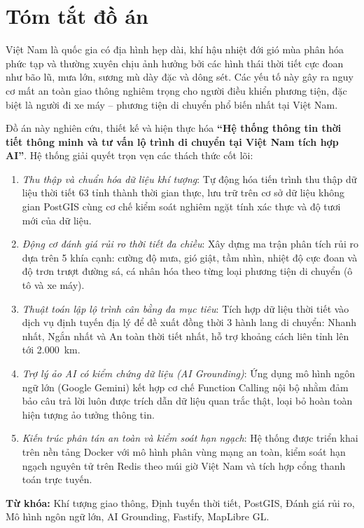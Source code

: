 \chapter*{Tóm tắt đồ án}

Việt Nam là quốc gia có địa hình hẹp dài, khí hậu nhiệt đới gió mùa phân hóa phức tạp và thường xuyên chịu ảnh hưởng bởi các hình thái thời tiết cực đoan như bão lũ, mưa lớn, sương mù dày đặc và dông sét. Các yếu tố này gây ra nguy cơ mất an toàn giao thông nghiêm trọng cho người điều khiển phương tiện, đặc biệt là người đi xe máy -- phương tiện di chuyển phổ biến nhất tại Việt Nam.

Đồ án này nghiên cứu, thiết kế và hiện thực hóa \textbf{“Hệ thống thông tin thời tiết thông minh và tư vấn lộ trình di chuyển tại Việt Nam tích hợp AI”}. Hệ thống giải quyết trọn vẹn các thách thức cốt lõi:
\begin{enumerate}
    \item \textit{Thu thập và chuẩn hóa dữ liệu khí tượng}: Tự động hóa tiến trình thu thập dữ liệu thời tiết 63 tỉnh thành thời gian thực, lưu trữ trên cơ sở dữ liệu không gian PostGIS cùng cơ chế kiểm soát nghiêm ngặt tính xác thực và độ tươi mới của dữ liệu.
    \item \textit{Động cơ đánh giá rủi ro thời tiết đa chiều}: Xây dựng ma trận phân tích rủi ro dựa trên 5 khía cạnh: cường độ mưa, gió giật, tầm nhìn, nhiệt độ cực đoan và độ trơn trượt đường sá, cá nhân hóa theo từng loại phương tiện di chuyển (ô tô và xe máy).
    \item \textit{Thuật toán lập lộ trình cân bằng đa mục tiêu}: Tích hợp dữ liệu thời tiết vào dịch vụ định tuyến địa lý để đề xuất đồng thời 3 hành lang di chuyển: Nhanh nhất, Ngắn nhất và An toàn thời tiết nhất, hỗ trợ khoảng cách liên tỉnh lên tới 2.000~km.
    \item \textit{Trợ lý ảo AI có kiểm chứng dữ liệu (AI Grounding)}: Ứng dụng mô hình ngôn ngữ lớn (Google Gemini) kết hợp cơ chế Function Calling nội bộ nhằm đảm bảo câu trả lời luôn được trích dẫn dữ liệu quan trắc thật, loại bỏ hoàn toàn hiện tượng ảo tưởng thông tin.
    \item \textit{Kiến trúc phân tán an toàn và kiểm soát hạn ngạch}: Hệ thống được triển khai trên nền tảng Docker với mô hình phân vùng mạng an toàn, kiểm soát hạn ngạch nguyên tử trên Redis theo múi giờ Việt Nam và tích hợp cổng thanh toán trực tuyến.
\end{enumerate}

\textbf{Từ khóa:} Khí tượng giao thông, Định tuyến thời tiết, PostGIS, Đánh giá rủi ro, Mô hình ngôn ngữ lớn, AI Grounding, Fastify, MapLibre GL.

